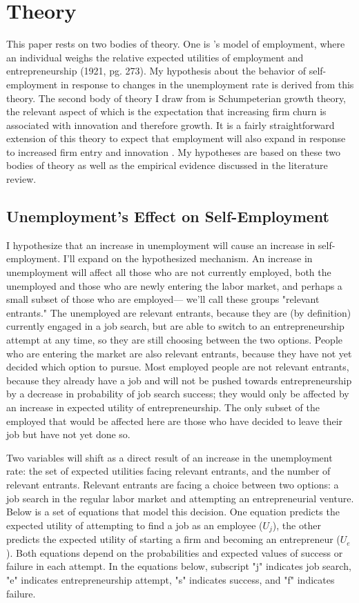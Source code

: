 \documentclass[]{ecca}
\begin{document}
\section{Theory}

This paper rests on two bodies of theory. One is \citeauthor{knight}'s model of employment, where an individual weighs the relative expected utilities of employment and entrepreneurship (1921, pg. 273). My hypothesis about the behavior of self-employment in response to changes in the unemployment rate is derived from this theory. The second body of theory I draw from is Schumpeterian growth theory, the relevant aspect of which is the expectation that increasing firm churn is associated with innovation and therefore growth. It is a fairly straightforward extension of this theory to expect that employment will also expand in response to increased firm entry and innovation \citep{fritsch04}. My hypotheses are based on these two bodies of theory as well as the empirical evidence discussed in the literature review.

\subsection{Unemployment's Effect on Self-Employment}

I hypothesize that an increase in unemployment will cause an increase in self-employment. I'll expand on the hypothesized mechanism. An increase in unemployment will affect all those who are not currently employed, both the unemployed and those who are newly entering the labor market, and perhaps a small subset of those who are employed--- we'll call these groups "relevant entrants." The unemployed are relevant entrants, because they are (by definition) currently engaged in a job search, but are able to switch to an entrepreneurship attempt at any time, so they are still choosing between the two options. People who are entering the market are also relevant entrants, because they have not yet decided which option to pursue. Most employed people are not relevant entrants, because they already have a job and will not be pushed towards entrepreneurship by a decrease in probability of job search success; they would only be affected by an increase in expected utility of entrepreneurship. The only subset of the employed that would be affected here are those who have decided to leave their job but have not yet done so. 

Two variables will shift as a direct result of an increase in the unemployment rate: the set of expected utilities facing relevant entrants, and the number of relevant entrants. Relevant entrants are facing a choice between two options: a job search in the regular labor market and attempting an entrepreneurial venture. Below is a set of equations that model this decision. One equation predicts the expected utility of attempting to find a job as an employee ($U_j$), the other predicts the expected utility of starting a firm and becoming an entrepreneur ($U_e$). Both equations depend on the probabilities and expected values of success or failure in each attempt. In the equations below, subscript "j" indicates job search, "e" indicates entrepreneurship attempt, "s" indicates success, and "f" indicates failure.
\end{document}
